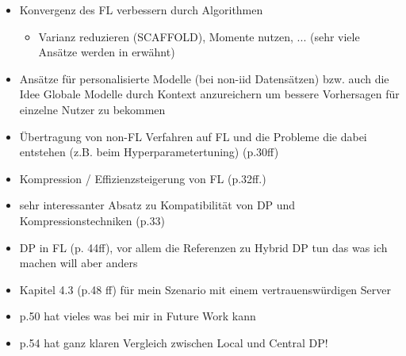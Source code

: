 \begin{itemize}
	\item Konvergenz des FL verbessern durch Algorithmen
	\begin{itemize}
		\item Varianz reduzieren (SCAFFOLD), Momente nutzen, ... (sehr viele Ansätze werden in \textcite[p.26ff]{kairouz:2021} erwähnt)
	\end{itemize}
	\item Ansätze für personalisierte Modelle (bei non-iid Datensätzen) \parencite[p.28ff]{kairouz:2021} bzw. auch die Idee Globale Modelle durch Kontext anzureichern um bessere Vorhersagen für einzelne Nutzer zu bekommen
	\item Übertragung von non-FL Verfahren auf FL und die Probleme die dabei entstehen (z.B. beim Hyperparametertuning) (p.30ff)
	\item Kompression / Effizienzsteigerung von FL (p.32ff.)
	\item sehr interessanter Absatz zu Kompatibilität von DP und Kompressionstechniken (p.33)
	\item DP in FL (p. 44ff), vor allem die Referenzen zu Hybrid DP tun das was ich machen will aber anders
	\item Kapitel 4.3 (p.48 ff) für mein Szenario mit einem vertrauenswürdigen Server
	\item p.50 hat vieles was bei mir in Future Work kann
	\item p.54 hat ganz klaren Vergleich zwischen Local und Central DP!
\end{itemize}